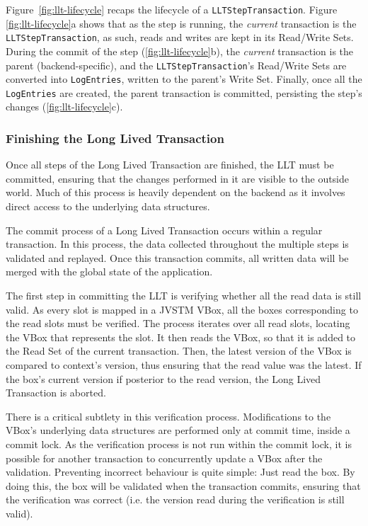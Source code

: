 \documentclass{llncs}
\begin{document}
Figure~\ref{fig:llt-lifecycle} recaps the lifecycle of a
\texttt{LLTStepTransaction}. Figure \ref{fig:llt-lifecycle}a shows
that as the step is running, the {\it current} transaction is the
\texttt{LLTStepTransaction}, as such, reads and writes are kept in its
Read/Write Sets. During the commit of the step
(\ref{fig:llt-lifecycle}b), the {\it current} transaction is the
parent (backend-specific), and the \texttt{LLTStepTransaction}'s
Read/Write Sets are converted into \texttt{LogEntries}, written to the
parent's Write Set. Finally, once all the \texttt{LogEntries} are
created, the parent transaction is committed, persisting the step's
changes (\ref{fig:llt-lifecycle}c).

\subsubsection{Finishing the Long Lived Transaction}
\label{sec:jvstm-commit}

Once all steps of the Long Lived Transaction are finished, the LLT
must be committed, ensuring that the changes performed in it are
visible to the outside world. Much of this process is heavily
dependent on the backend as it involves direct access to the
underlying data structures.

The commit process of a Long Lived Transaction occurs within a regular
transaction. In this process, the data collected throughout the
multiple steps is validated and replayed. Once this transaction
commits, all written data will be merged with the global state of the
application.

The first step in committing the LLT is verifying whether all the read
data is still valid. As every slot is mapped in a JVSTM VBox, all the
boxes corresponding to the read slots must be verified. The process
iterates over all read slots, locating the VBox that represents the
slot. It then reads the VBox, so that it is added to the Read Set of
the current transaction. Then, the latest version of the VBox is
compared to context's version, thus ensuring that the read value was
the latest. If the box's current version if posterior to the read
version, the Long Lived Transaction is aborted.

There is a critical subtlety in this verification
process. Modifications to the VBox's underlying data structures are
performed only at commit time, inside a commit lock. As the
verification process is not run within the commit lock, it is possible
for another transaction to concurrently update a VBox after the
validation. Preventing incorrect behaviour is quite simple: Just read
the box. By doing this, the box will be validated when the transaction
commits, ensuring that the verification was correct (i.e. the version
read during the verification is still valid).
\end{document}
